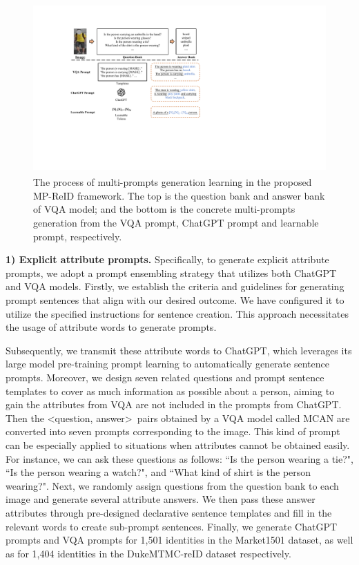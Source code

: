 \documentclass[letterpaper]{article} %
\begin{document}
\begin{figure}[t]
    \centering
    \label{frameprompt}
    \includegraphics[width=\linewidth,height=6.5cm]{prompts.pdf}
    \caption{The process of multi-prompts generation learning in the proposed MP-ReID framework. The top is the question bank and answer bank of VQA model; and the bottom is the concrete multi-prompts generation from the VQA prompt, ChatGPT prompt and learnable prompt, respectively.}
    \label{frameprompt}
\end{figure}

\textbf{1) Explicit attribute prompts.} Specifically, to generate explicit attribute prompts, we adopt a prompt ensembling strategy that utilizes both ChatGPT and VQA models. Firstly, we establish the criteria and guidelines for generating prompt sentences that align with our desired outcome. We have configured it to utilize the specified instructions for sentence creation. This approach necessitates the usage of attribute words to generate prompts.

Subsequently, we transmit these attribute words to ChatGPT, which leverages its large model pre-training prompt learning to automatically generate sentence prompts. Moreover, we design
seven related questions and prompt sentence templates to cover as much information as possible about a person, aiming to gain the attributes from VQA are not included in the prompts from ChatGPT. Then the \textless question, answer\textgreater~pairs obtained by a VQA model called MCAN \cite{yu2019mcan} are converted into seven prompts corresponding to the image. This kind of prompt can be especially applied to situations when attributes cannot be obtained easily. For instance, we can ask these questions as follows: ``Is the person wearing a tie?", ``Is the person wearing a watch?", and ``What kind of shirt is the person wearing?". Next, we randomly assign questions from the question bank to each image and generate several attribute answers. We then pass these answer attributes through pre-designed declarative sentence templates and fill in the relevant words to create sub-prompt sentences. Finally, we generate ChatGPT prompts and VQA prompts for 1,501 identities in the Market1501 dataset, as well as for 1,404 identities in the DukeMTMC-reID dataset respectively.
\end{document}
